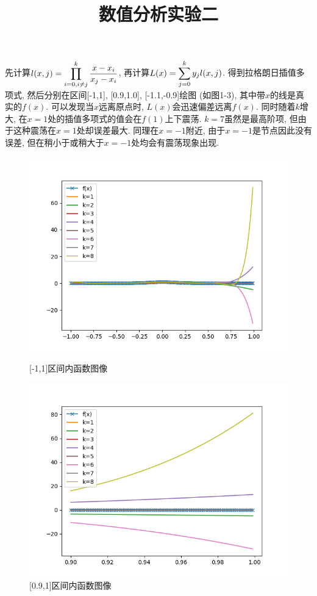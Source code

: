 \documentclass[UTF8,9pt]{ctexart}
\title{数值分析实验二}
\begin{document}
 
\maketitle
{}
先计算$\displaystyle l(x,j) = \prod_{i=0,i\neq j}^k \frac{x-x_i}{x_j-x_i}$, 再计算$\displaystyle L(x)=\sum_{j=0}^k y_jl(x,j)$. 得到拉格朗日插值多项式, 然后分别在区间[-1,1], [0.9,1.0], [-1.1,-0.9]绘图 (如图1-3), 其中带$x$的线是真实的$f(x)$. 可以发现当$x$远离原点时, $L(x)$会迅速偏差远离$f(x)$. 同时随着$k$增大, 在$x=1$处的插值多项式的值会在$f(1)$上下震荡. $k=7$虽然是最高阶项, 但由于这种震荡在$x=1$处却误差最大. 同理在$x=-1$附近, 由于$x=-1$是节点因此没有误差, 但在稍小于或稍大于$x=-1$处均会有震荡现象出现. 
\begin{figure}[htbp]
        \centering
        \begin{minipage}[t]{0.48\textwidth}
        \centering
        \includegraphics[scale=0.4]{1.png}
        \caption{[-1,1]区间内函数图像}
        \end{minipage}
        \begin{minipage}[t]{0.48\textwidth}
        \centering
        \includegraphics[scale=0.4]{2.png}
        \caption{[0.9,1]区间内函数图像}
        \end{minipage}
\end{figure}
\end{document}

